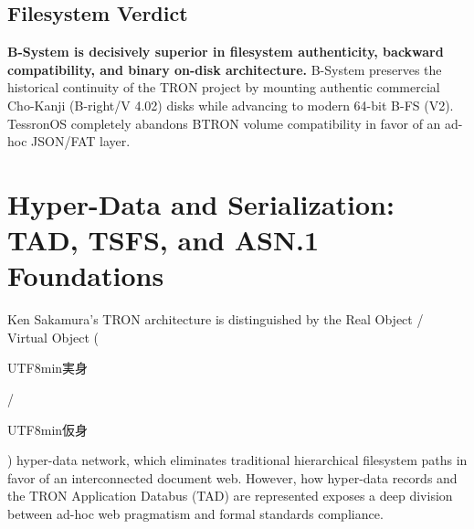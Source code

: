 \documentclass[10pt,journal,compsoc,twocolumn]{article}
\newcommand{\ja}[1]{\begin{CJK*}{UTF8}{min}#1\end{CJK*}}
\begin{document}
\begin{table}[htbp]
\centering
\caption{Filesystem Support: Authentic Cho-Kanji vs. Modern V2}
\label{tab:fs_comparison}
\end{table}

\subsection{Filesystem Verdict}
\textbf{B-System is decisively superior in filesystem authenticity, backward compatibility, and binary on-disk architecture.} B-System preserves the historical continuity of the TRON project by mounting authentic commercial Cho-Kanji (B-right/V 4.02) disks while advancing to modern 64-bit B-FS (V2). TessronOS completely abandons BTRON volume compatibility in favor of an ad-hoc JSON/FAT layer.

\section{Hyper-Data and Serialization: TAD, TSFS, and ASN.1 Foundations}
\label{sec:tad}

Ken Sakamura's TRON architecture is distinguished by the Real Object / Virtual Object (\ja{実身}/\ja{仮身}) hyper-data network, which eliminates traditional hierarchical filesystem paths in favor of an interconnected document web. However, how hyper-data records and the TRON Application Databus (TAD) are represented exposes a deep division between ad-hoc web pragmatism and formal standards compliance.
\end{document}

